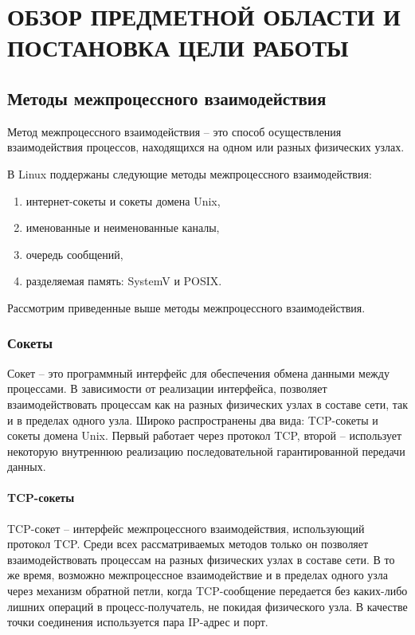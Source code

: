 \chapter{ОБЗОР ПРЕДМЕТНОЙ ОБЛАСТИ И ПОСТАНОВКА ЦЕЛИ РАБОТЫ}

\startrelatedwork

\section{Методы межпроцессного взаимодействия}

Метод межпроцессного взаимодействия -- это способ осуществления взаимодействия процессов, находящихся на одном или разных физических узлах.

В Linux поддержаны следующие методы межпроцессного взаимодействия:
\begin{enumerate}
\item интернет-сокеты и сокеты домена Unix,
\item именованные и неименованные каналы,
\item очередь сообщений,
\item разделяемая память: SystemV и POSIX.
\end{enumerate}

Рассмотрим приведенные выше методы межпроцессного взаимодействия.

\subsection{Сокеты}

Сокет -- это программный интерфейс для обеспечения обмена данными между процессами. В зависимости от реализации интерфейса, позволяет взаимодействовать процессам как на разных физических узлах в составе сети, так и в пределах одного узла. Широко распространены два вида: TCP-сокеты и сокеты домена Unix. Первый работает через протокол TCP, второй -- использует некоторую внутреннюю реализацию последовательной гарантированной передачи данных.

\subsubsection{TCP-сокеты}
TCP-сокет -- интерфейс межпроцессного взаимодействия, использующий протокол TCP. Среди всех рассматриваемых методов только он позволяет взаимодействовать процессам на разных физических узлах в составе сети. В то же время, возможно межпроцессное взаимодействие и в пределах одного узла через механизм обратной петли, когда TCP-сообщение передается без каких-либо лишних операций в процесс-получатель, не покидая физического узла. В качестве точки соединения используется пара IP-адрес и порт.

